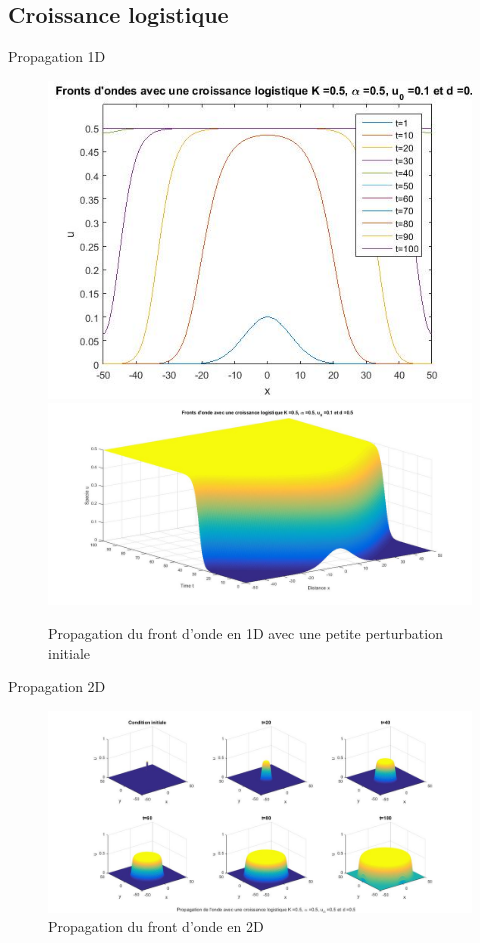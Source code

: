 \documentclass[10pt]{beamer}
\begin{document}
\subsection{Croissance logistique}
\begin{frame}{Propagation 1D}{}
\begin{figure}[H]
	\centering
	\includegraphics[width=0.45\linewidth]{SimulationKPP/TrigerEffect/fronts}\hfill
	\includegraphics[width=0.55\linewidth]{SimulationKPP/TrigerEffect/Surf}\hfill
	\caption{Propagation du front d'onde en 1D avec une petite perturbation initiale}
\end{figure}
\end{frame}

\begin{frame}{Propagation 2D}{}
\begin{figure}[H]
	\centering
	\includegraphics[width=1\linewidth]{SimulationKPP/KPP13}
    \caption{Propagation du front d'onde en 2D }
\end{figure}
\end{frame}
\end{document}
